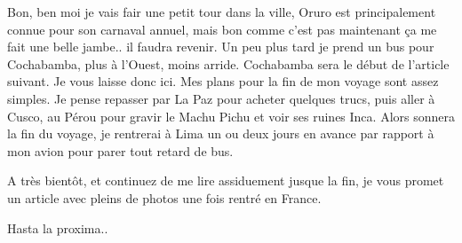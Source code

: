 \begin{multicols}{2}
Bon, ben moi je vais fair une petit tour dans la ville, Oruro est principalement connue pour son carnaval annuel, mais bon comme c'est pas maintenant ça me fait une belle jambe.. il faudra revenir. Un peu plus tard je prend un bus pour Cochabamba, plus à l'Ouest, moins arride. Cochabamba sera le début de l'article suivant. Je vous laisse donc ici. Mes plans pour la fin de mon voyage sont assez simples. Je pense repasser par La Paz pour acheter quelques trucs, puis aller à Cusco, au Pérou pour gravir le Machu Pichu et voir ses ruines Inca. Alors sonnera la fin du voyage, je rentrerai à Lima un ou deux jours en avance par rapport à mon avion pour parer tout retard de bus.

A très bientôt, et continuez de me lire assiduement jusque la fin, je vous promet un article avec pleins de photos une fois rentré en France.

Hasta la proxima..

\end{multicols}


